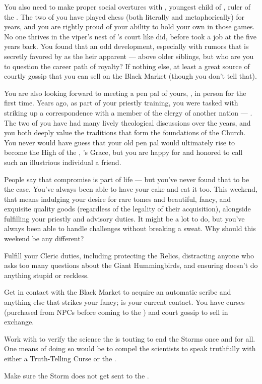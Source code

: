 \documentclass[char]{GL2020}
\begin{document}
You also need to make proper social overtures with \cPrince{\full}, youngest child of \cQueen{\full}, ruler of the \pFarm{}. The two of you have played chess (both literally and metaphorically) for years, and you are rightly proud of your ability to hold your own in those games. No one thrives in the viper’s nest of \cQueen{}’s court like \cPrince{} did, before \cPrince{} took a job at the \pSchool{} five years back. You found that an odd development, especially with rumors that \cPrince{} is secretly favored by \cQueen{} as the heir apparent — above \cPrince{\their} older siblings, but who are you to question the career path of royalty? If nothing else, at least \cPrince{\theyare} a great source of courtly gossip that you can sell on the Black Market (though you don't tell \cPrince{\them} that). 

You are also looking forward to meeting a pen pal of yours, \cAntiChup{\full}, in person for the first time. Years ago, as part of your priestly training, you were tasked with striking up a correspondence with a member of the clergy of another nation — \cAntiChup{}. The two of you have had many lively theological discussions over the years, and you both deeply value the traditions that form the foundations of the Church. You never would have guess that your old pen pal would ultimately rise to become the High \cAntiChup{\Cleric} of the \pTech{}, \cTechGod{}’s Grace, but you are happy for \cAntiChup{\them} and honored to call such an illustrious individual a friend.

People say that compromise is part of life — but you've never found that to be the case. You've always been able to have your cake and eat it too. This weekend, that means indulging your desire for rare tomes and beautiful, fancy, and exquisite quality goods (regardless of the legality of their acquisition), alongside fulfilling your priestly and advisory duties. It might be a lot to do, but you've always been able to handle challenges without breaking a sweat. Why should this weekend be any different?

\begin{itemz}
    \item Fulfill your Cleric duties, including protecting the Relics, distracting anyone who asks too many questions about the Giant Hummingbirds, and ensuring \cDisney{} doesn’t do anything stupid or reckless.
    \item Get in contact with the Black Market to acquire an automatic scribe and anything else that strikes your fancy; \cChupSecond{} is your current contact. You have curses (purchased from NPCs before coming to the \pSchool{}) and court gossip to sell in exchange.
    \item Work with \cCurse{} to verify the science the \pTech{} is touting to end the Storms once and for all. One means of doing so would be to compel the scientists to speak truthfully with either a Truth-Telling Curse or the \iLariat{}.
    \item Make sure the Storm does not get sent to the \pFarm{}.
\end{itemz}
\end{document}
